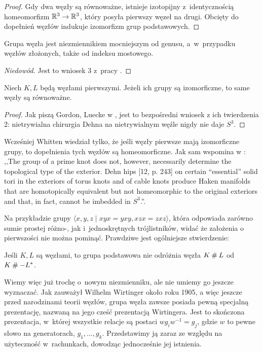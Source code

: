 \begin{proof}
    Gdy dwa węzły są równoważne, istnieje izotopijny z~identycznością homeomorfizm $\mathbb R^3 \to \mathbb R^3$, który posyła pierwszy węzeł na drugi.
    Obcięty do dopełnień węzłów indukuje izomorfizm grup podstawowych.
\end{proof}

\begin{proposition}
    Grupa węzła jest niezmiennikiem mocniejszym od genusu, a~w~przypadku węzłów złożonych, także od indeksu mostowego.
\end{proposition}

\begin{proof}[Niedowód]
    Jest to wniosek 3 z~pracy \cite{feustel78}.
\end{proof}

\begin{proposition}
    Niech $K, L$ będą węzłami pierwszymi.
    Jeżeli ich grupy są izomorficzne, to same węzły są równoważne.
\end{proposition}

\begin{proof}
    Jak piszą Gordon, Luecke w \cite{gordon89}, jest to bezpośredni wniosek z ich twierdzenia 2: nietrywialna chirurgia Dehna na nietrywialnym węźle nigdy nie daje $S^3$.
\end{proof}

Wcześniej Whitten wiedział tylko, że jeśli węzły pierwsze mają izomorficzne grupy, to dopełnienia tych węzłów są homeomorficzne.
Jak sam wspomina w \cite{whitten87}: ,,The group of a prime knot does not, however, necessarily determine the topological type of the exterior. Dehn hips [12, p. 243] on certain “essential” solid tori in the exteriors of torus knots and of cable knots produce Haken manifolds that are homotopically equivalent but not homeomorphic to the original exteriors and that, in fact, cannot be imbedded in $S^3$.''.

Na przykładzie grupy $\langle x,y,z \mid xyx=yxy,xzx=zxz\rangle$, która odpowiada zarówno sumie prostej różno-, jak i~jednoskrętnych trójlistników, widać że założenia o pierwszości nie można pominąć.
Prawdziwe jest ogólniejsze stwierdzenie:

\begin{proposition}
    \label{prop:knot_group_sum}
    Jeśli $K, L$ są węzłami, to grupa podstawowa nie odróżnia węzła $K \mathbin{\#} L$ od $K \mathbin{\#} -L^*$.
\end{proposition}

Wiemy więc już trochę o~nowym niezmienniku, ale nie umiemy go jeszcze wyznaczać.
Jak zauważył Wilhelm Wirtinger około roku 1905, a więc jeszcze przed narodzinami teorii węzłów, grupa węzła zawsze posiada pewną specjalną prezentację, nazwaną na jego cześć prezentacją Wirtingera.
Jest to skończona prezentacja, w~której wszystkie relacje są postaci $w g_i w^{-1} = g_j$, gdzie $w$ to pewne słowo na generatorach, $g_1, \ldots, g_k$.
Przedstawimy ją zaraz ze względu na użyteczność w~rachunkach, dowodząc jednocześnie jej istnienia.

